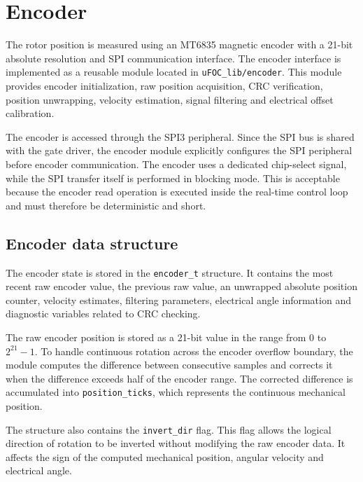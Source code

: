 
\section{Encoder}
The rotor position is measured using an MT6835 magnetic encoder with a 21-bit absolute resolution and SPI communication interface.\cite{datasheet_MT6835}
The encoder interface is implemented as a reusable module located in \texttt{uFOC\_lib/encoder}. This module provides encoder initialization, 
raw position acquisition, CRC verification, position unwrapping, velocity estimation, signal filtering and electrical offset calibration.

The encoder is accessed through the SPI3 peripheral. Since the SPI bus is shared with the gate driver, 
the encoder module explicitly configures the SPI peripheral before encoder communication. The encoder uses a dedicated chip-select signal, 
while the SPI transfer itself is performed in blocking mode. 
This is acceptable because the encoder read operation is executed inside the real-time control loop and must therefore be deterministic and short.

\subsection{Encoder data structure}

The encoder state is stored in the \texttt{encoder\_t} structure. It contains the most recent raw encoder value, the previous raw value, an unwrapped absolute position counter, velocity estimates, filtering parameters, electrical angle information and diagnostic variables related to CRC checking.

The raw encoder position is stored as a 21-bit value in the range from $0$ to $2^{21}-1$. To handle continuous rotation across the encoder overflow boundary, the module computes the difference between consecutive samples and corrects it when the difference exceeds half of the encoder range. The corrected difference is accumulated into \texttt{position\_ticks}, which represents the continuous mechanical position.

The structure also contains the \texttt{invert\_dir} flag. This flag allows the logical direction of rotation to be inverted without modifying the raw encoder data. It affects the sign of the computed mechanical position, angular velocity and electrical angle.

